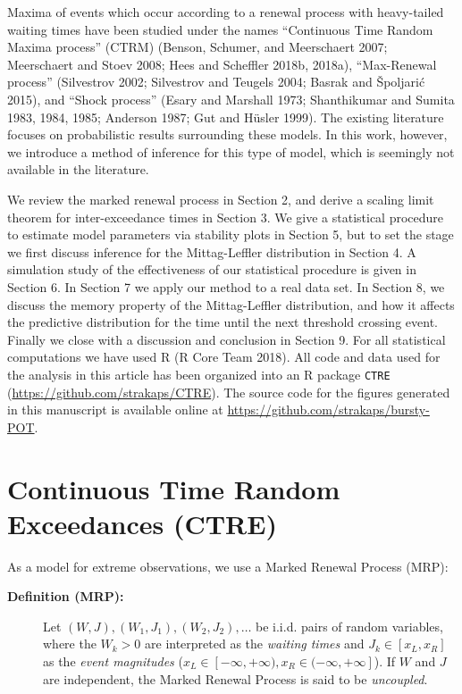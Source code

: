 \documentclass[]{elsarticle} %
\begin{document}
Maxima of events which occur according to a renewal process with
heavy-tailed waiting times have been studied under the names
``Continuous Time Random Maxima process'' (CTRM) (Benson, Schumer, and
Meerschaert 2007; Meerschaert and Stoev 2008; Hees and Scheffler 2018b,
2018a), ``Max-Renewal process'' (Silvestrov 2002; Silvestrov and Teugels
2004; Basrak and Špoljarić 2015), and ``Shock process'' (Esary and
Marshall 1973; Shanthikumar and Sumita 1983, 1984, 1985; Anderson 1987;
Gut and Hüsler 1999). The existing literature focuses on probabilistic
results surrounding these models. In this work, however, we introduce a
method of inference for this type of model, which is seemingly not
available in the literature.

We review the marked renewal process in Section 2, and derive a scaling
limit theorem for inter-exceedance times in Section 3. We give a
statistical procedure to estimate model parameters via stability plots
in Section 5, but to set the stage we first discuss inference for the
Mittag-Leffler distribution in Section 4. A simulation study of the
effectiveness of our statistical procedure is given in Section 6. In
Section 7 we apply our method to a real data set. In Section 8, we
discuss the memory property of the Mittag-Leffler distribution, and how
it affects the predictive distribution for the time until the next
threshold crossing event. Finally we close with a discussion and
conclusion in Section 9. For all statistical computations we have used R
(R Core Team 2018). All code and data used for the analysis in this
article has been organized into an R package \texttt{CTRE}
(\url{https://github.com/strakaps/CTRE}). The source code for the
figures generated in this manuscript is available online at
\url{https://github.com/strakaps/bursty-POT}.

\hypertarget{continuous-time-random-exceedances-ctre}{%
\section{Continuous Time Random Exceedances
(CTRE)}\label{continuous-time-random-exceedances-ctre}}

As a model for extreme observations, we use a Marked Renewal Process
(MRP):

\begin{description}
\item[\textbf{Definition (MRP):}]
Let \((W,J), (W_1, J_1), (W_2, J_2), \ldots\) be i.i.d. pairs of random
variables, where the \(W_k > 0\) are interpreted as the \emph{waiting
times} and \(J_k \in [x_L, x_R]\) as the \emph{event magnitudes}
(\(x_L \in [-\infty, +\infty), x_R \in (-\infty, +\infty]\)). If \(W\)
and \(J\) are independent, the Marked Renewal Process is said to be
\emph{uncoupled}.
\end{description}
\end{document}
